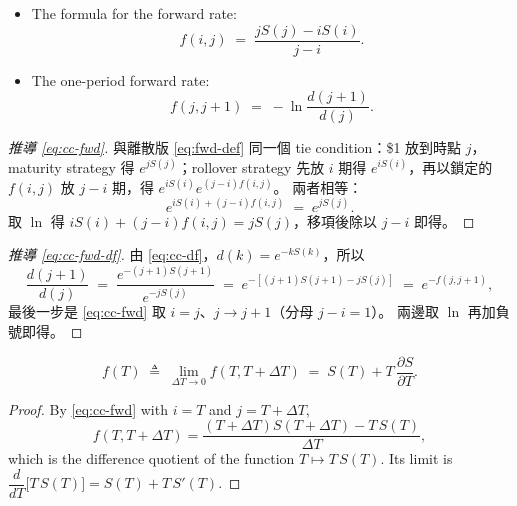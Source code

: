 \begin{itemize}[itemsep=0.35em]
	\item The formula for the forward rate:
	      \begin{equation}
		      f(i,j) \;=\; \frac{jS(j)-iS(i)}{j-i} . \label{eq:cc-fwd}
	      \end{equation}
	\item The one-period forward rate:
	      \begin{equation}
		      f(j,j+1) \;=\; -\ln\frac{d(j+1)}{d(j)} . \label{eq:cc-fwd-df}
	      \end{equation}
\end{itemize}

\suppstart
\begin{proof}[推導 \eqref{eq:cc-fwd}]
	與離散版 \eqref{eq:fwd-def} 同一個 tie condition：\$1 放到時點 $j$，
	maturity strategy 得 $e^{jS(j)}$；rollover strategy 先放 $i$ 期得 $e^{iS(i)}$，再以鎖定的 $f(i,j)$ 放 $j-i$ 期，得 $e^{iS(i)}e^{(j-i)f(i,j)}$。
	兩者相等：
	\[
		e^{iS(i)+(j-i)f(i,j)} \;=\; e^{jS(j)} .
	\]
	取 $\ln$ 得 $iS(i)+(j-i)f(i,j)=jS(j)$，移項後除以 $j-i$ 即得。
\end{proof}

\begin{proof}[推導 \eqref{eq:cc-fwd-df}]
	由 \eqref{eq:cc-df}，$d(k)=e^{-kS(k)}$，所以
	\[
		\frac{d(j+1)}{d(j)} \;=\; \frac{e^{-(j+1)S(j+1)}}{e^{-jS(j)}} \;=\; e^{-[(j+1)S(j+1)-jS(j)]} \;=\; e^{-f(j,j+1)} ,
	\]
	最後一步是 \eqref{eq:cc-fwd} 取 $i=j$、$j\to j+1$（分母 $j-i=1$）。
	兩邊取 $\ln$ 再加負號即得。
\end{proof}
\suppend


\begin{definition}
	\begin{equation}
		f(T) \;\triangleq\; \lim_{\Delta T\to 0} f(T,T+\Delta T) \;=\; S(T) + T\,\frac{\partial S}{\partial T} . \label{eq:inst-fwd}
	\end{equation}
\end{definition}

\suppstart
\begin{proof}
	By \eqref{eq:cc-fwd} with $i=T$ and $j=T+\Delta T$,
	\[
		f(T,T+\Delta T) = \frac{(T+\Delta T)S(T+\Delta T) - T\,S(T)}{\Delta T} ,
	\]
	which is the difference quotient of the function $T\mapsto T\,S(T)$.
	Its limit is $\dfrac{d}{dT}\bigl[T\,S(T)\bigr] = S(T)+T\,S'(T)$.
\end{proof}
\suppend

